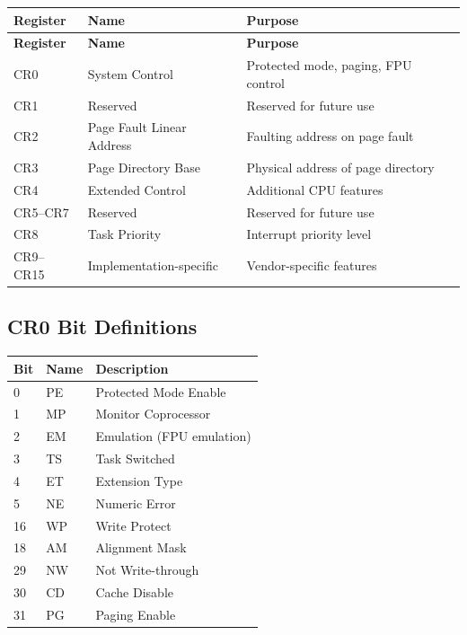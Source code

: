 \documentclass[12pt]{article}
\begin{document}
\begin{longtable}{@{}lll@{}}
\toprule
\textbf{Register} & \textbf{Name} & \textbf{Purpose} \\ \midrule
\endfirsthead
\toprule
\textbf{Register} & \textbf{Name} & \textbf{Purpose} \\ \midrule
\endhead
CR0 & System Control & Protected mode, paging, FPU control \\
CR1 & Reserved & Reserved for future use \\
CR2 & Page Fault Linear Address & Faulting address on page fault \\
CR3 & Page Directory Base & Physical address of page directory \\
CR4 & Extended Control & Additional CPU features \\
CR5--CR7 & Reserved & Reserved for future use \\
CR8 & Task Priority & Interrupt priority level \\
CR9--CR15 & Implementation-specific & Vendor-specific features \\ \bottomrule
\end{longtable}

\subsection{CR0 Bit Definitions}

\begin{table}[h]
\centering
\begin{tabular}{@{}lll@{}}
\toprule
\textbf{Bit} & \textbf{Name} & \textbf{Description} \\ \midrule
0 & PE & Protected Mode Enable \\
1 & MP & Monitor Coprocessor \\
2 & EM & Emulation (FPU emulation) \\
3 & TS & Task Switched \\
4 & ET & Extension Type \\
5 & NE & Numeric Error \\
16 & WP & Write Protect \\
18 & AM & Alignment Mask \\
29 & NW & Not Write-through \\
30 & CD & Cache Disable \\
31 & PG & Paging Enable \\ \bottomrule
\end{tabular}
\end{table}
\end{document}

